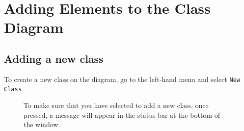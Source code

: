 \documentclass[a4paper]{article}
\begin{document}
\newpage

\section{Adding Elements to the Class Diagram}
\subsection{Adding a new class}
To create a new class on the diagram, go to the left-hand menu and select \texttt{New Class}
\begin{figure}[H]
\begin{center}
\end{center}

To make sure that you have selected to add a new class, once pressed, a message will appear in the status bar at the bottom of the window
\begin{center}
\end{center}


\end{figure}
\end{document}
